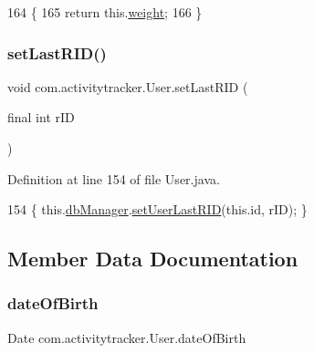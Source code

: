 \begin{DoxyCode}
164                              \{
165         \textcolor{keywordflow}{return} this.\mbox{\hyperlink{classcom_1_1activitytracker_1_1_user_a8a30c6c08983e513b462bcc035434c9e}{weight}};
166     \}
\end{DoxyCode}
\mbox{\label{classcom_1_1activitytracker_1_1_user_a9e91c79596a9a4dfda7b3453b61ff8d2}} 
\subsubsection{\texorpdfstring{set\+Last\+R\+I\+D()}{setLastRID()}}
{\footnotesize\ttfamily void com.\+activitytracker.\+User.\+set\+Last\+R\+ID (\begin{DoxyParamCaption}\item[{final int}]{r\+ID }\end{DoxyParamCaption})}



Definition at line 154 of file User.\+java.


\begin{DoxyCode}
154 \{ this.\mbox{\hyperlink{classcom_1_1activitytracker_1_1_user_a8c8b36433447a235f2b4940b92e839c1}{dbManager}}.\mbox{\hyperlink{classcom_1_1activitytracker_1_1_d_b_manager_a93b7fc4c2d0083e125852d84f087a8d3}{setUserLastRID}}(this.\textcolor{keywordtype}{id}, rID); \}
\end{DoxyCode}


\subsection{Member Data Documentation}
\mbox{\label{classcom_1_1activitytracker_1_1_user_a40b0d4ce16246066c0e948edef864d94}} 
\subsubsection{\texorpdfstring{date\+Of\+Birth}{dateOfBirth}}
{\footnotesize\ttfamily Date com.\+activitytracker.\+User.\+date\+Of\+Birth\hspace{0.3cm}{\ttfamily [private]}}

